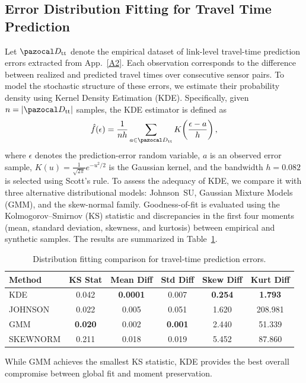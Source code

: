 \documentclass[a4paper,fleqn]{cas-sc}
\begin{document}
\subsection{Error Distribution Fitting for Travel Time Prediction}\label{A3}
Let $\pazocal D_{\text{tt}}$ denote the empirical dataset of link-level travel-time prediction errors extracted from App.~\ref{A2}.
Each observation corresponds to the difference between realized and predicted travel times over consecutive sensor pairs.
%
To model the stochastic structure of these errors, we estimate their probability density using Kernel Density Estimation (KDE).
Specifically, given $n = |\pazocal D_{\text{tt}}|$ samples, the KDE estimator is defined as
\begin{equation}
\hat f(\epsilon)
=\frac{1}{n h}
\sum_{a\in\pazocal D_{\text{tt}}}
K\!\left(\frac{\epsilon-a}{h}\right),
\label{eq:PDF_occRATE}
\end{equation}
where $\epsilon$ denotes the prediction-error random variable, $a$ is an observed error sample,
$K(u)=\frac{1}{\sqrt{2\pi}}e^{-u^{2}/2}$ is the Gaussian kernel, and
the bandwidth $h=0.082$ is selected using Scott’s rule.
%
To assess the adequacy of KDE, we compare it with three alternative distributional models:
Johnson~SU, Gaussian Mixture Models (GMM), and the skew-normal family.
Goodness-of-fit is evaluated using the Kolmogorov--Smirnov (KS) statistic and discrepancies in the first four moments
(mean, standard deviation, skewness, and kurtosis) between empirical and synthetic samples.
The results are summarized in Table~\ref{tab:dist_comparison}.
%
\begin{table}[h]
\centering
\small
\begin{tabular}{lccccc}
\toprule
Method   & KS Stat & Mean Diff & Std Diff & Skew Diff & Kurt Diff \\
\midrule
KDE      & 0.042   & \textbf{0.0001} & 0.007 & \textbf{0.254} & \textbf{1.793} \\
JOHNSON  & 0.022   & 0.005           & 0.051 & 1.620          & 208.981        \\
GMM      & \textbf{0.020} & 0.002   & \textbf{0.001} & 2.440 & 51.339 \\
SKEWNORM & 0.211   & 0.018           & 0.019 & 5.452          & 87.860         \\
\bottomrule
\end{tabular}
\caption{Distribution fitting comparison for travel-time prediction errors.}
\label{tab:dist_comparison}
\end{table}
%
While GMM achieves the smallest KS statistic, KDE provides the best overall compromise between global fit and moment preservation.
\end{document}
